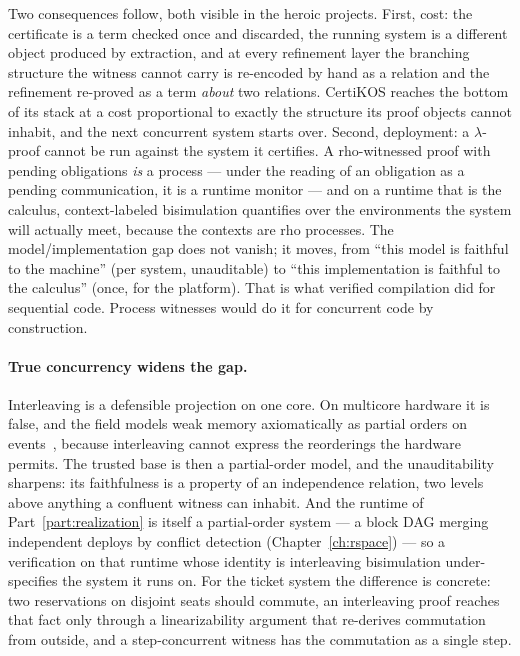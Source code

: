Two consequences follow, both visible in the heroic projects.
First, cost: the certificate is a term checked once and discarded, the
running system is a different object produced by extraction, and at
every refinement layer the branching structure the witness cannot carry
is re-encoded by hand as a relation and the refinement re-proved as a
term \emph{about} two relations.
CertiKOS reaches the bottom of its stack at a cost proportional to
exactly the structure its proof objects cannot inhabit, and the next
concurrent system starts over.
Second, deployment: a $\lambda$-proof cannot be run against the system
it certifies.
A rho-witnessed proof with pending obligations \emph{is} a process ---
under the reading of an obligation as a pending communication, it is a
runtime monitor --- and on a runtime that is the calculus,
context-labeled bisimulation quantifies over the environments the
system will actually meet, because the contexts are rho processes.
The model/implementation gap does not vanish; it moves, from ``this
model is faithful to the machine'' (per system, unauditable) to ``this
implementation is faithful to the calculus'' (once, for the platform).
That is what verified compilation did for sequential code.
Process witnesses would do it for concurrent code by construction.

\paragraph{True concurrency widens the gap.}
Interleaving is a defensible projection on one core.
On multicore hardware it is false, and the field models weak memory
axiomatically as partial orders on events~\cite{Herd}, because
interleaving cannot express the reorderings the hardware permits.
The trusted base is then a partial-order model, and the unauditability
sharpens: its faithfulness is a property of an independence relation,
two levels above anything a confluent witness can inhabit.
And the runtime of Part~\ref{part:realization} is itself a partial-order
system --- a block DAG merging independent deploys by conflict
detection (Chapter~\ref{ch:rspace}) --- so a verification on that
runtime whose identity is interleaving bisimulation under-specifies the
system it runs on.
For the ticket system the difference is concrete: two reservations on
disjoint seats should commute, an interleaving proof reaches that fact
only through a linearizability argument that re-derives commutation from
outside, and a step-concurrent witness has the commutation as a single
step.

